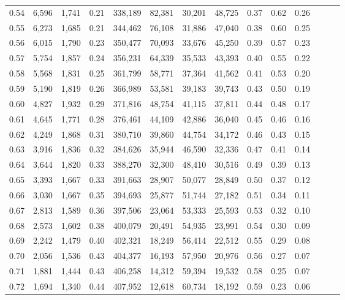 \begin{tabular}{rrrrrrrrrrrrrr}
0.54 &  6,596 &  1,741 &  0.21 &  338,189 &   82,381 &  30,201 &  48,725 &  0.37 &  0.62 &      0.26 \\
0.55 &  6,273 &  1,685 &  0.21 &  344,462 &   76,108 &  31,886 &  47,040 &  0.38 &  0.60 &      0.25 \\
0.56 &  6,015 &  1,790 &  0.23 &  350,477 &   70,093 &  33,676 &  45,250 &  0.39 &  0.57 &      0.23 \\
0.57 &  5,754 &  1,857 &  0.24 &  356,231 &   64,339 &  35,533 &  43,393 &  0.40 &  0.55 &      0.22 \\
0.58 &  5,568 &  1,831 &  0.25 &  361,799 &   58,771 &  37,364 &  41,562 &  0.41 &  0.53 &      0.20 \\
0.59 &  5,190 &  1,819 &  0.26 &  366,989 &   53,581 &  39,183 &  39,743 &  0.43 &  0.50 &      0.19 \\
0.60 &  4,827 &  1,932 &  0.29 &  371,816 &   48,754 &  41,115 &  37,811 &  0.44 &  0.48 &      0.17 \\
0.61 &  4,645 &  1,771 &  0.28 &  376,461 &   44,109 &  42,886 &  36,040 &  0.45 &  0.46 &      0.16 \\
0.62 &  4,249 &  1,868 &  0.31 &  380,710 &   39,860 &  44,754 &  34,172 &  0.46 &  0.43 &      0.15 \\
0.63 &  3,916 &  1,836 &  0.32 &  384,626 &   35,944 &  46,590 &  32,336 &  0.47 &  0.41 &      0.14 \\
0.64 &  3,644 &  1,820 &  0.33 &  388,270 &   32,300 &  48,410 &  30,516 &  0.49 &  0.39 &      0.13 \\
0.65 &  3,393 &  1,667 &  0.33 &  391,663 &   28,907 &  50,077 &  28,849 &  0.50 &  0.37 &      0.12 \\
0.66 &  3,030 &  1,667 &  0.35 &  394,693 &   25,877 &  51,744 &  27,182 &  0.51 &  0.34 &      0.11 \\
0.67 &  2,813 &  1,589 &  0.36 &  397,506 &   23,064 &  53,333 &  25,593 &  0.53 &  0.32 &      0.10 \\
0.68 &  2,573 &  1,602 &  0.38 &  400,079 &   20,491 &  54,935 &  23,991 &  0.54 &  0.30 &      0.09 \\
0.69 &  2,242 &  1,479 &  0.40 &  402,321 &   18,249 &  56,414 &  22,512 &  0.55 &  0.29 &      0.08 \\
0.70 &  2,056 &  1,536 &  0.43 &  404,377 &   16,193 &  57,950 &  20,976 &  0.56 &  0.27 &      0.07 \\
0.71 &  1,881 &  1,444 &  0.43 &  406,258 &   14,312 &  59,394 &  19,532 &  0.58 &  0.25 &      0.07 \\
0.72 &  1,694 &  1,340 &  0.44 &  407,952 &   12,618 &  60,734 &  18,192 &  0.59 &  0.23 &      0.06 \\

\end{tabular}

